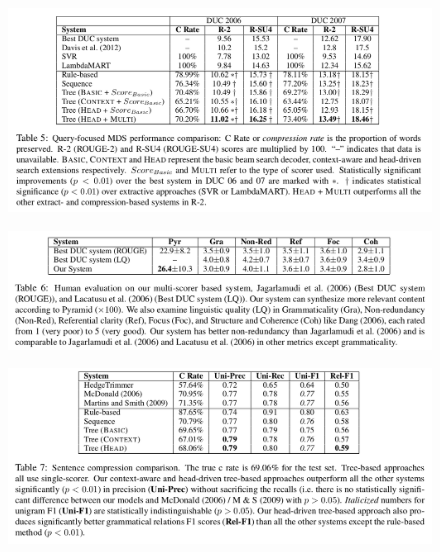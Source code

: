 \documentclass[xcolor={table}]{beamer}
\begin{document}
\begin{frame}{\cite{wang2013sentence}}
\begin{figure}[h]
\centering
\includegraphics[scale=.27]{images/table5-wang13} 
\end{figure}
\end{frame}

\begin{frame}{\cite{wang2013sentence}}
\begin{figure}[h]
\centering
\includegraphics[scale=.27]{images/table6-wang13} 
\end{figure}
\end{frame}

\begin{frame}{\cite{wang2013sentence}}
\begin{figure}[h]
\centering
\includegraphics[scale=.27]{images/table7-wang13} 
\end{figure}
\end{frame}
\end{document}

